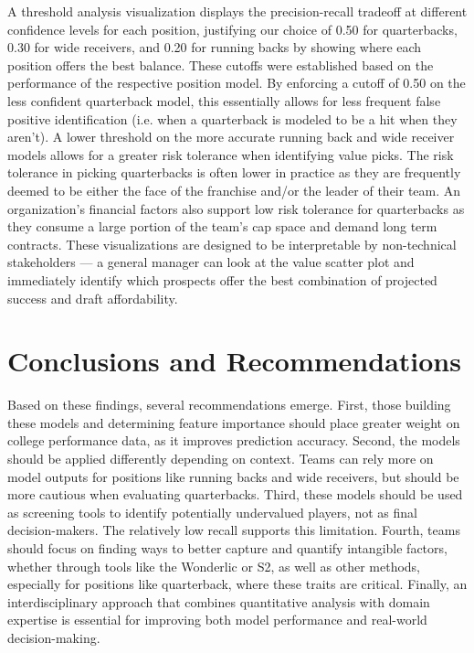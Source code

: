 \documentclass[11pt]{article}
\begin{document}
A threshold analysis visualization displays the precision-recall tradeoff at different confidence levels for each position, justifying our choice of 0.50 for quarterbacks, 0.30 for wide receivers, and 0.20 for running backs by showing where each position offers the best balance. These cutoffs were established based on the performance of the respective position model. By enforcing a cutoff of 0.50 on the less confident quarterback model, this essentially allows for less frequent false positive identification (i.e. when a quarterback is modeled to be a hit when they aren't). A lower threshold on the more accurate running back and wide receiver models allows for a greater risk tolerance when identifying value picks. The risk tolerance in picking quarterbacks is often lower in practice as they are frequently deemed to be either the face of the franchise and/or the leader of their team. An organization's financial factors also support low risk tolerance for quarterbacks as they consume a large portion of the team's cap space and demand long term contracts. These visualizations are designed to be interpretable by non-technical stakeholders — a general manager can look at the value scatter plot and immediately identify which prospects offer the best combination of projected success and draft affordability.


\section{Conclusions and Recommendations}
Based on these findings, several recommendations emerge. First, those building these models and determining feature importance should place greater weight on college performance data, as it improves prediction accuracy. Second, the models should be applied differently depending on context. Teams can rely more on model outputs for positions like running backs and wide receivers, but should be more cautious when evaluating quarterbacks. Third, these models should be used as screening tools to identify potentially undervalued players, not as final decision-makers. The relatively low recall supports this limitation. Fourth, teams should focus on finding ways to better capture and quantify intangible factors, whether through tools like the Wonderlic or S2, as well as other methods, especially for positions like quarterback, where these traits are critical. Finally, an interdisciplinary approach that combines quantitative analysis with domain expertise is essential for improving both model performance and real-world decision-making.
\end{document}
